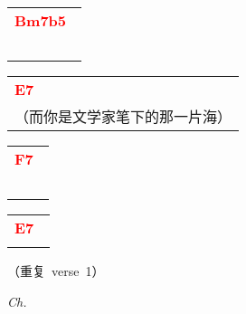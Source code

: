 \documentclass[12pt,a4paper,openany,UTF8]{memoir}
\begin{document}
\begin{tabular}[b]{l}
    \textbf{\textcolor{red}{Bm7b5\ }}\\~\mbox{}\end{tabular}\begin{tabular}[b]{l}
    \textbf{\textcolor{red}{E7\ }}\\（而你是文学家笔下的那一片海）\mbox{}\end{tabular}\begin{tabular}[b]{l}
    \textbf{\textcolor{red}{F7\ }}\\~\mbox{}\end{tabular}\begin{tabular}[b]{l}
    \textbf{\textcolor{red}{E7\ }}\\\mbox{}\end{tabular}

    \vspace{\parskip}

   （重复~verse~1）

    \vspace{\parskip}

   \emph{Ch.}

    \vspace{\parskip}
\end{document}
